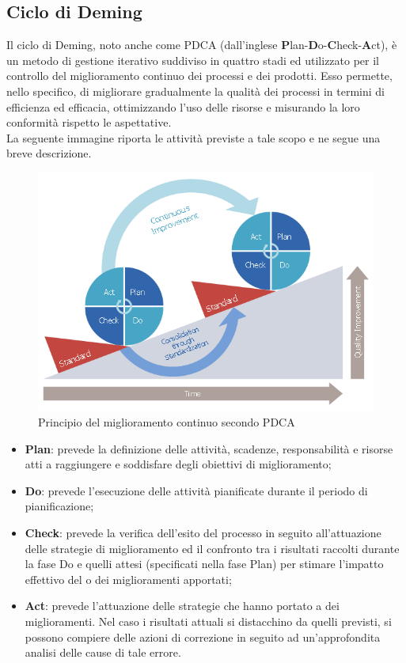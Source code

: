 \subsection{Ciclo di Deming}
Il ciclo di Deming, noto anche come PDCA (dall'inglese \textbf{P}lan-\textbf{D}o-\textbf{C}heck-\textbf{A}ct), è un metodo di gestione iterativo suddiviso in quattro stadi ed utilizzato per il controllo del miglioramento continuo dei processi e dei prodotti. Esso permette, nello specifico, di migliorare gradualmente la qualità dei processi in termini di efficienza ed efficacia, ottimizzando l'uso delle risorse e misurando la loro conformità rispetto le aspettative. \\
La seguente immagine riporta le attività previste a tale scopo e ne segue una breve descrizione. 
\begin{figure}[htbp]
	\centering
	\includegraphics[scale=0.5]{images/pdca.png}
	\caption{Principio del miglioramento continuo secondo PDCA}
	
\end{figure}

\begin{itemize}
	\item \textbf{Plan}: prevede la definizione delle attività, scadenze, responsabilità e risorse atti a raggiungere e soddisfare degli obiettivi di miglioramento;
	\item \textbf{Do}: prevede l'esecuzione delle attività pianificate durante il periodo di pianificazione;
	\item \textbf{Check}: prevede la verifica dell'esito del processo in seguito all'attuazione delle strategie di miglioramento ed il confronto tra i risultati raccolti durante la fase Do e quelli attesi (specificati nella fase Plan) per stimare l'impatto effettivo del o dei miglioramenti apportati;
	\item \textbf{Act}: prevede l'attuazione delle strategie che hanno portato a dei miglioramenti. Nel caso i risultati attuali si distacchino da quelli previsti, si possono compiere delle azioni di correzione in seguito ad un'approfondita analisi delle cause di tale errore. 
\end{itemize}

